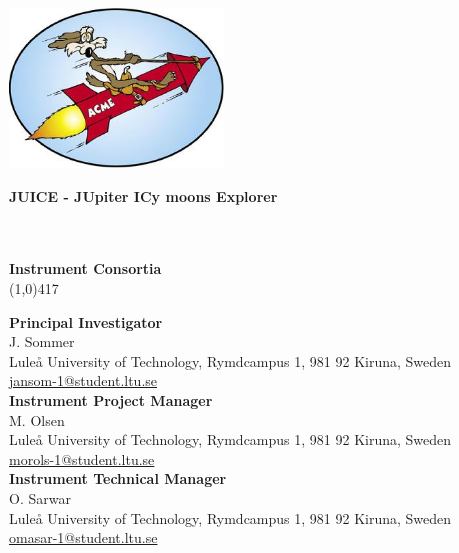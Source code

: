 \begin{titlepage}
\begin{center}
\begin{flushright}
\includegraphics[height=120pt]{Figures/Logo3.jpg}
\end{flushright}
%
\begin{flushleft}
\vspace{5mm}
\Large \bfseries{JUICE - JUpiter ICy moons Explorer}\\
\Large \bfseries{\doctitle}\\ 
\Large \bfseries{\docsubtitle}\\
%
\vspace{15mm}
%
%
%
\begin{normalsize}
%
\textbf{Instrument Consortia}\\
\vspace{-0.9em}
\line(1,0){417}\\
%
\end{normalsize}
%
\begin{small}
\textbf{Principal Investigator}\\
J. Sommer\\
Lule\r{a} University of Technology, Rymdcampus 1, 981 92 Kiruna, Sweden\\
\href{mailto:jansom-1@student.ltu.se}{jansom-1@student.ltu.se}\\[5mm]
%
\textbf{Instrument Project Manager}\\
M. Olsen\\
Lule\r{a} University of Technology, Rymdcampus 1, 981 92 Kiruna, Sweden\\
\href{mailto:morols-1@student.ltu.se}{morols-1@student.ltu.se}\\[5mm]
%
\textbf{Instrument Technical Manager}\\
O. Sarwar\\
Lule\r{a} University of Technology, Rymdcampus 1, 981 92 Kiruna, Sweden\\
\href{mailto:omasar-1@student.ltu.se}{omasar-1@student.ltu.se}\\
\end{small}

\end{flushleft}
\end{center}
\end{titlepage}
